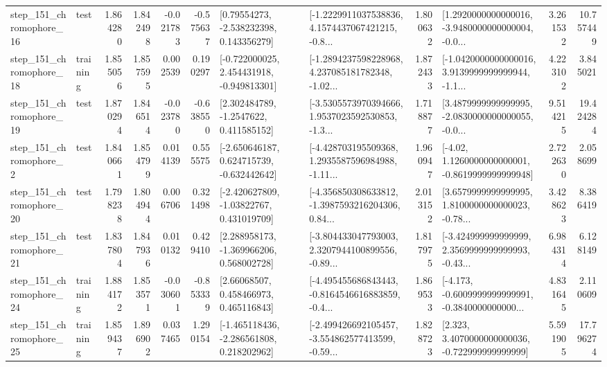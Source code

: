 \begin{tabular}{llrrrrllrlrr}
  step\_151\_chromophore\_16 &      test &      1.864280 &    1.842498 &     -0.021783 & -0.575637 &     [0.79554273, -2.538232398, 0.143356279] &  [-1.2229911037538836, 4.1574437067421215, -0.8... &       1.800632 &  [1.2920000000000016, -3.9480000000000004, -0.0... &            3.261532 &         10.757449 \\
  step\_151\_chromophore\_18 &  training &      1.855056 &    1.857595 &      0.002539 &  0.190297 &   [-0.722000025, 2.454431918, -0.949813301] &  [-1.2894237598228968, 4.237085181782348, -1.02... &       1.872433 &  [-1.0420000000000016, 3.9139999999999944, -1.1... &            4.223102 &          3.845021 \\
  step\_151\_chromophore\_19 &      test &      1.870294 &    1.846514 &     -0.023780 & -0.638550 &      [2.302484789, -1.2547622, 0.411585152] &  [-3.5305573970394666, 1.9537023592530853, -1.3... &       1.718877 &  [3.4879999999999995, -2.0830000000000055, -0.0... &            9.514215 &         19.424284 \\
   step\_151\_chromophore\_2 &      test &      1.840661 &    1.854799 &      0.014139 &  0.555575 &   [-2.650646187, 0.624715739, -0.632442642] &  [-4.428703195509368, 1.2935587596984988, -1.11... &       1.960947 &   [-4.02, 1.1260000000000001, -0.8619999999999948] &            2.722630 &          2.058699 \\
  step\_151\_chromophore\_20 &      test &      1.798238 &    1.804944 &      0.006706 &  0.321498 &    [-2.420627809, -1.03822767, 0.431019709] &  [-4.356850308633812, -1.3987593216204306, 0.84... &       2.013152 &  [3.6579999999999995, 1.8100000000000023, -0.78... &            3.428623 &          8.386419 \\
  step\_151\_chromophore\_21 &      test &      1.837804 &    1.847936 &      0.010132 &  0.429410 &    [2.288958173, -1.369966206, 0.568002728] &  [-3.804433047793003, 2.3207944100899556, -0.89... &       1.817975 &  [-3.424999999999999, 2.3569999999999993, -0.43... &            6.984314 &          6.128149 \\
  step\_151\_chromophore\_24 &  training &      1.884172 &    1.853571 &     -0.030601 & -0.853339 &      [2.66068507, 0.458466973, 0.465116843] &  [-4.495455686843443, -0.8164546616883859, -0.4... &       1.869533 &  [-4.173, -0.6009999999999991, -0.3840000000000... &            4.831645 &          2.110609 \\
  step\_151\_chromophore\_25 &  training &      1.859437 &    1.896902 &      0.037465 &  1.290154 &   [-1.465118436, -2.286561808, 0.218202962] &  [-2.499426692105457, -3.554862577413599, -0.59... &       1.828723 &    [2.323, 3.4070000000000036, -0.722999999999999] &            5.591905 &         17.796274 \\

\end{tabular}
